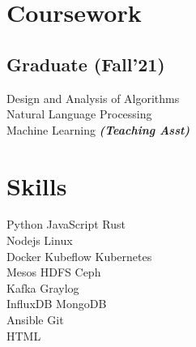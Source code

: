 \documentclass[]{deedy-resume-openfont}
\begin{document}
\begin{minipage}[t]{0.33\textwidth}
\section{Coursework}
\subsection{Graduate
(Fall'21)}
\textbullet{} Design and Analysis of Algorithms \\
\textbullet{} Natural Language Processing \\
\textbullet{} Machine Learning
{\footnotesize \textit{\textbf{(Teaching Asst) }}} 
\sectionsep


\section{Skills}
\textbullet{} Python \textbullet{} JavaScript \textbullet{} Rust \\
\textbullet{} Nodejs \textbullet{} Linux \\
\textbullet{} Docker
\textbullet{} Kubeflow
\textbullet{} Kubernetes \\
\textbullet{} Mesos
\textbullet{} HDFS
\textbullet{} Ceph \\
\textbullet{} Kafka
\textbullet{} Graylog \\
\textbullet{} InfluxDB
\textbullet{} MongoDB \\
\textbullet{} Ansible
\textbullet{} Git \\
\textbullet{} HTML 
\sectionsep

%
%

\end{minipage} 
\hfill
\end{document}
